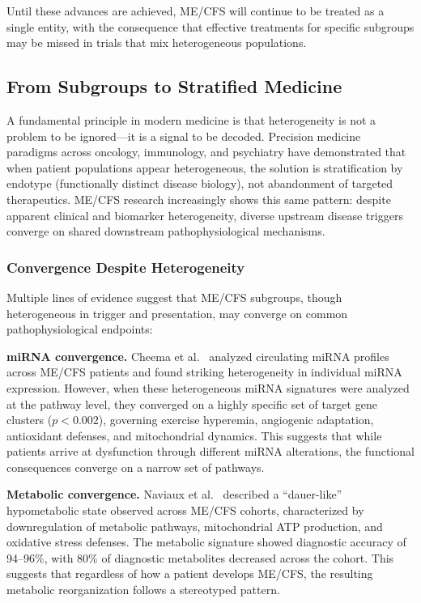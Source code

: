 Until these advances are achieved, ME/CFS will continue to be treated as a single entity, with the consequence that effective treatments for specific subgroups may be missed in trials that mix heterogeneous populations.

\subsection{From Subgroups to Stratified Medicine}

A fundamental principle in modern medicine is that heterogeneity is not a problem to be ignored---it is a signal to be decoded. Precision medicine paradigms across oncology, immunology, and psychiatry have demonstrated that when patient populations appear heterogeneous, the solution is stratification by endotype (functionally distinct disease biology), not abandonment of targeted therapeutics. ME/CFS research increasingly shows this same pattern: despite apparent clinical and biomarker heterogeneity, diverse upstream disease triggers converge on shared downstream pathophysiological mechanisms.

\subsubsection*{Convergence Despite Heterogeneity}

Multiple lines of evidence suggest that ME/CFS subgroups, though heterogeneous in trigger and presentation, may converge on common pathophysiological endpoints:

\textbf{miRNA convergence.} Cheema et al.~\cite{Cheema2023mirna} analyzed circulating miRNA profiles across ME/CFS patients and found striking heterogeneity in individual miRNA expression. However, when these heterogeneous miRNA signatures were analyzed at the pathway level, they converged on a highly specific set of target gene clusters ($p < 0.002$), governing exercise hyperemia, angiogenic adaptation, antioxidant defenses, and mitochondrial dynamics. This suggests that while patients arrive at dysfunction through different miRNA alterations, the functional consequences converge on a narrow set of pathways.

\textbf{Metabolic convergence.} Naviaux et al.~\cite{Naviaux2016metabolic} described a ``dauer-like'' hypometabolic state observed across ME/CFS cohorts, characterized by downregulation of metabolic pathways, mitochondrial ATP production, and oxidative stress defenses. The metabolic signature showed diagnostic accuracy of 94--96\%, with 80\% of diagnostic metabolites decreased across the cohort. This suggests that regardless of how a patient develops ME/CFS, the resulting metabolic reorganization follows a stereotyped pattern.

